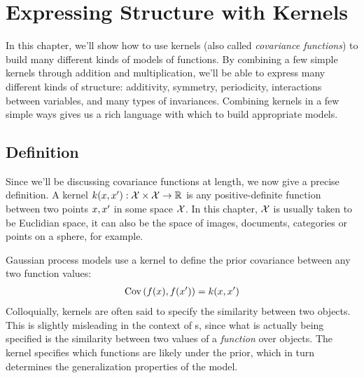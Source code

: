 
\inbpdocument

\chapter{Expressing Structure with Kernels}
\label{ch:kernels}

In this chapter, we'll show how to use kernels (also called \emph{covariance functions}) to build many different kinds of models of functions.
By combining a few simple kernels through addition and multiplication, we'll be able to express many different kinds of structure: additivity, symmetry, periodicity, interactions between variables, and many types of invariances.
Combining kernels in a few simple ways gives us a rich language with which to build appropriate models.


\section{Definition}

Since we'll be discussing covariance functions at length, we now give a precise definition.
A kernel $k(x, x') : \mathcal{X} \times \mathcal{X} \to \mathbb{R}$ is any positive-definite function between two points $x, x'$ in some space $\mathcal{X}$.
In this chapter, $\mathcal{X}$ is usually taken to be Euclidian space, %
it can also be the space of images, documents, categories or points on a sphere, for example.

Gaussian process models use a kernel to define the prior covariance between any two function values:
%
\begin{align}
\textrm{Cov}\left(f(x), f(x') \right) = k(x,x')
\end{align}
%
Colloquially, kernels are often said to specify the similarity between two objects.
This is slightly misleading in the context of \gp{}s, since what is actually being specified is the similarity between two values of a \emph{function} over objects.
The kernel specifies which functions are likely under the \gp{} prior, which in turn determines the generalization properties of the model.


